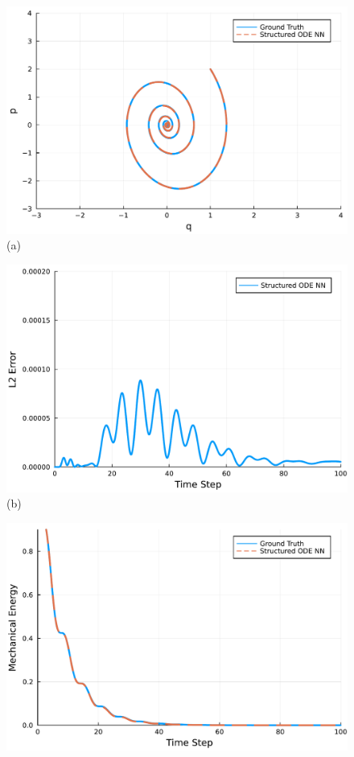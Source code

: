 \documentclass[
	parskip, 			   %
	twoside, 			   %
	DIV=14, 			   %
	BCOR=15.0mm, 		   %
	headsepline, 		   %
	open=right, 		   %
	captions=tableheading, %
	bibliography=totoc,    %
	numbers=noenddot       %
]{scrreprt}
\begin{document}
\begin{figure}[h!]
    \centering
    \begin{minipage}{.3\textwidth}
    \centering
    \includegraphics[width=1\linewidth]{figures/phase_portrait_compositional_idho_reuse.pdf}
    \\(a)
    \end{minipage}%
    \begin{minipage}{.3\textwidth}
    \centering
    \includegraphics[width=1\linewidth]{figures/prediction_error_compositional_idho_reuse.pdf}
    \\(b)
    \end{minipage}%
    \begin{minipage}{.3\textwidth}
    \centering
    \includegraphics[width=1\linewidth]{figures/Hamiltonian_evolution_compositional_idho_reuse.pdf}

\end{minipage}
\end{figure}
\end{document}
